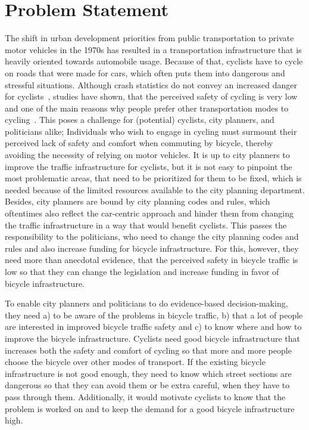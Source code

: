 \section{Problem Statement}
\label{sec:problem}
The shift in urban development priorities from public transportation to private motor vehicles in the 1970s has resulted in a transportation infrastructure that is heavily oriented towards automobile usage.
Because of that, cyclists have to cycle on roads that were made for cars, which often puts them into dangerous and stressful situations.
Although crash statistics do not convey an increased danger for cyclists~\cite{juhra2012bicycle}, studies have shown, that the perceived safety of cycling is very low and one of the main reasons why people prefer other transportation modes to cycling~\cite{horton2016fear}.
This poses a challenge for (potential) cyclists, city planners, and politicians alike;
Individuals who wish to engage in cycling must surmount their perceived lack of safety and comfort when commuting by bicycle, thereby avoiding the necessity of relying on motor vehicles. 
It is up to city planners to improve the traffic infrastructure for cyclists, but it is not easy to pinpoint the most problematic areas, that need to be prioritized for them to be fixed, which is needed because of the limited resources available to the city planning department.
Besides, city planners are bound by city planning codes and rules, which oftentimes also reflect the car-centric approach and hinder them from changing the traffic infrastructure in a way that would benefit cyclists.
This passes the responsibility to the politicians, who need to change the city planning codes and rules and also increase funding for bicycle infrastructure.
For this, however, they need more than anecdotal evidence, that the perceived safety in bicycle traffic is low so that they can change the legislation and increase funding in favor of bicycle infrastructure.

To enable city planners and politicians to do evidence-based decision-making, they need a) to be aware of the problems in bicycle traffic, b) that a lot of people are interested in improved bicycle traffic safety and c) to know where and how to improve the bicycle infrastructure.
Cyclists need good bicycle infrastructure that increases both the safety and comfort of cycling so that more and more people choose the bicycle over other modes of transport.
If the existing bicycle infrastructure is not good enough, they need to know which street sections are dangerous so that they can avoid them or be extra careful, when they have to pass through them.
Additionally, it would motivate cyclists to know that the problem is worked on and to keep the demand for a good bicycle infrastructure high. 

